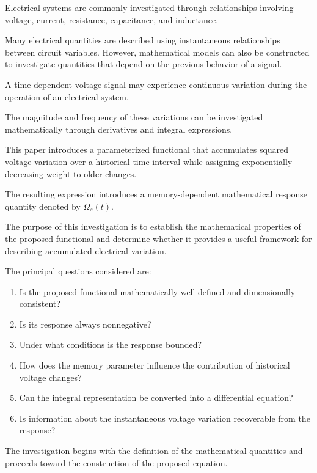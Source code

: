 \documentclass[12pt]{article}
\theoremstyle{definition}
\theoremstyle{remark}
\begin{document}
Electrical systems are commonly investigated
through relationships involving voltage, current,
resistance, capacitance, and inductance.

Many electrical quantities are described using
instantaneous relationships between circuit
variables. However, mathematical models can also
be constructed to investigate quantities that
depend on the previous behavior of a signal.

A time-dependent voltage signal may experience
continuous variation during the operation of
an electrical system.

The magnitude and frequency of these variations
can be investigated mathematically through
derivatives and integral expressions.

This paper introduces a parameterized functional
that accumulates squared voltage variation over
a historical time interval while assigning
exponentially decreasing weight to older changes.

The resulting expression introduces a
memory-dependent mathematical response quantity
denoted by \(\Omega_s(t)\).

The purpose of this investigation is to establish
the mathematical properties of the proposed
functional and determine whether it provides
a useful framework for describing accumulated
electrical variation.

The principal questions considered are:

\begin{enumerate}
    \item Is the proposed functional mathematically
    well-defined and dimensionally consistent?

    \item Is its response always nonnegative?

    \item Under what conditions is the response bounded?

    \item How does the memory parameter influence
    the contribution of historical voltage changes?

    \item Can the integral representation be
    converted into a differential equation?

    \item Is information about the instantaneous
    voltage variation recoverable from the response?
\end{enumerate}

The investigation begins with the definition
of the mathematical quantities and proceeds
toward the construction of the proposed equation.
\end{document}
